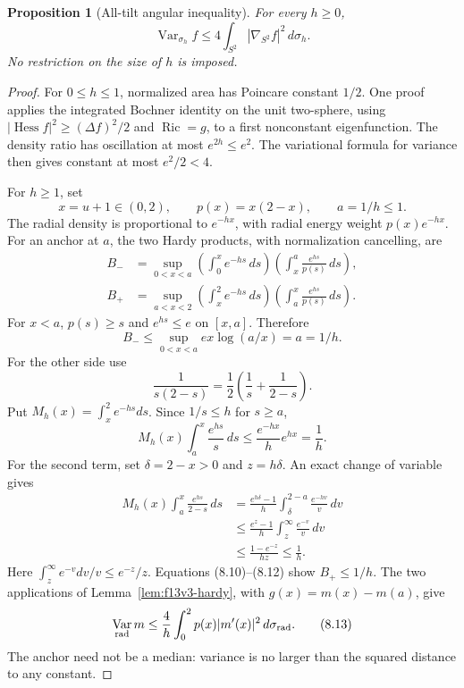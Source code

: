 \documentclass[11pt,oneside]{article}
\newtheorem{proposition}[theorem]{Proposition}
\DeclareMathOperator{\Var}{Var}
\DeclareMathOperator{\Hess}{Hess}
\DeclareMathOperator{\Ric}{Ric}
\begin{document}
\begin{proposition}[All-tilt angular inequality]
\label{prop:f13v3-linear}
For every \(h\ge0\),
\[
             \Var_{\sigma_h}f
                 \le4\int_{S^2}|\nabla_{S^2}f|^2\,d\sigma_h.
 \tag{8.6}
\]
No restriction on the size of
\(h\) is imposed.
\end{proposition}
\begin{proof}
For \(0\le h\le1\), normalized
area has Poincare constant \(1/2\).
One proof applies the integrated
Bochner identity on the unit
two-sphere, using
\(|\Hess f|^2\ge(\Delta f)^2/2\)
and \(\Ric=g\), to a first
nonconstant eigenfunction.
The density ratio has oscillation
at most \(e^{2h}\le e^2\).
The variational formula for
variance then gives constant
at most \(e^2/2<4\).

For \(h\ge1\), set
\[
 x=u+1\in(0,2),\qquad
 p(x)=x(2-x),\qquad a=1/h\le1.
 \tag{8.7}
\]
The radial density is
proportional to \(e^{-hx}\),
with radial energy weight
\(p(x)e^{-hx}\).
For an anchor at \(a\), the
two Hardy products, with
normalization cancelling, are
\[
 \begin{split}
 B_-&=\sup_{0<x<a}
       \left(\int_0^xe^{-hs}\,ds\right)
       \left(\int_x^a\frac{e^{hs}}{p(s)}\,ds\right),\\
 B_+&=\sup_{a<x<2}
       \left(\int_x^2e^{-hs}\,ds\right)
       \left(\int_a^x\frac{e^{hs}}{p(s)}\,ds\right).
 \end{split}
 \tag{8.8}
\]
For \(x<a\), \(p(s)\ge s\)
and \(e^{hs}\le e\) on
\([x,a]\). Therefore
\[
 B_-\le\sup_{0<x<a}ex\log(a/x)=a=1/h.
 \tag{8.9}
\]
For the other side use
\[
                \frac1{s(2-s)}
                    =\frac12\left(\frac1s+\frac1{2-s}\right).
 \tag{8.10}
\]
Put \(M_h(x)=\int_x^2e^{-hs}ds\).
Since \(1/s\le h\) for \(s\ge a\),
\[
 M_h(x)\int_a^x\frac{e^{hs}}s\,ds
       \le\frac{e^{-hx}}h e^{hx}=\frac1h .
 \tag{8.11}
\]
For the second term, set
\(\delta=2-x>0\) and \(z=h\delta\).
An exact change of variable gives
\[
 \begin{split}
 M_h(x)\int_a^x\frac{e^{hs}}{2-s}\,ds
 &=\frac{e^{h\delta}-1}{h}
                      \int_\delta^{2-a}\frac{e^{-hv}}v\,dv\\
 &\le\frac{e^z-1}{h}
                      \int_z^\infty\frac{e^{-v}}v\,dv\\
 &\le\frac{1-e^{-z}}{hz}\le\frac1h .
 \end{split}
 \tag{8.12}
\]
Here \(\int_z^\infty e^{-v}dv/v
\le e^{-z}/z\).
Equations (8.10)--(8.12) show
\(B_+\le1/h\).
The two applications of
Lemma~\ref{lem:f13v3-hardy},
with \(g(x)=m(x)-m(a)\),
give
\[
       \Var_{\rm rad}m
            \le\frac4h\int_0^2p(x)|m'(x)|^2\,d\sigma_{\rm rad}.
 \tag{8.13}
\]
The anchor need not be a median:
variance is no larger than
the squared distance to
any constant.


\end{proof}
\end{document}
